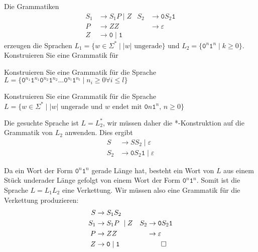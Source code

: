 Die Grammatiken
\begin{align*}
S_1 & \to S_1P \mid Z               & S_2 & \to \texttt{0}S_2\texttt{1}    \\
P   & \to ZZ                        &     & \to \varepsilon                \\
Z   & \to \texttt{0}\mid\texttt{1}  &     &                               
\end{align*}
erzeugen die Sprachen $L_1=\{w\in\Sigma^*\mid  \text{$|w|$ ungerade}\}$
und $L_2=\{\texttt{0}^n\texttt{1}^n \mid k\ge 0\}$.
Konstruieren Sie eine Grammatik für
\begin{teilaufgaben}
\item Konstruieren Sie eine Grammatik für die Sprache $L=\{
\texttt{0}^{n_1}\texttt{1}^{n_1}
\texttt{0}^{n_2}\texttt{1}^{n_2}
\dots
\texttt{0}^{n_l}\texttt{1}^{n_l}
\mid
n_i\ge 0\forall i\le l
\}$
\item Konstruieren Sie eine Grammatik für die Sprache $L=\{
w\in\Sigma^* \mid
\text{$|w|$ ungerade und $w$ endet mit $\texttt{0}n\texttt{1}^n$, $n\ge 0$}
\}$
\end{teilaufgaben}

\begin{loesung}
\begin{teilaufgaben}
\item
Die gesuchte Sprache ist $L=L_2^*$, wir müssen daher die *-Konstruktion
auf die Grammatik von $L_2$ anwenden.
Dies ergibt 
\begin{align*}
S   & \to SS_2 \mid \varepsilon  \\
S_2 & \to \texttt{0}S_2\texttt{1} \mid \varepsilon
\end{align*}
\item
Da ein Wort der Form $\texttt{0}^n\texttt{1}^n$ gerade Länge hat, besteht
ein Wort von $L$ aus einem Stück underader Länge gefolgt von einem
Wort der Form $\texttt{0}^n\texttt{1}^n$.
Somit ist die Sprache $L=L_1L_2$ eine Verkettung.
Wir müssen also eine Grammatik für die Verkettung produzieren:
\begin{align*}
S   & \to S_1S_2                    &     &                                \\
S_1 & \to S_1P \mid Z               & S_2 & \to \texttt{0}S_2\texttt{1}    \\
P   & \to ZZ                        &     & \to \varepsilon                \\
Z   & \to \texttt{0}\mid\texttt{1}  &     &                               
\qedhere
\end{align*}
\end{teilaufgaben}
\end{loesung}





